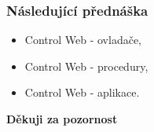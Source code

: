   \begin{frame}
    \frametitle{Následující přednáška}
		
		\begin{itemize}
			\item Control Web - ovladače,
			\item Control Web - procedury,
			\item Control Web - aplikace.
		\end{itemize}
		
		\begin{center}
			\textbf{Děkuji za pozornost}
		\end{center}
		
	\end{frame}